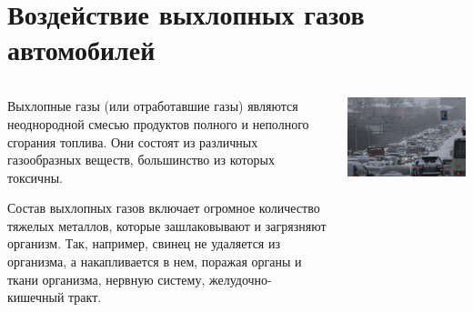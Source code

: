 \section{Воздействие выхлопных газов автомобилей}
\begin{frame}{\insertsectionhead}
    \begin{columns}[onlytextwidth,c]
        \begin{column}{.50\linewidth}
          \footnotesize
          Выхлопные газы (или отработавшие газы) являются неоднородной смесью продуктов полного и неполного сгорания топлива. 
          Они состоят из различных газообразных веществ, большинство из которых токсичны.
        
          \smallskip

          Состав выхлопных газов включает огромное количество тяжелых металлов, которые зашлаковывают и 
          загрязняют организм. Так, например, свинец не удаляется из организма, а накапливается в 
          нем, поражая органы и ткани организма, нервную систему, желудочно-кишечный тракт.\cite{exhausts}            
        \end{column}
      
        \begin{column}{.45\linewidth}
          \includegraphics[width=\textwidth]{assets/probki.jpg}
        \end{column}
      
      \end{columns}
\end{frame}

